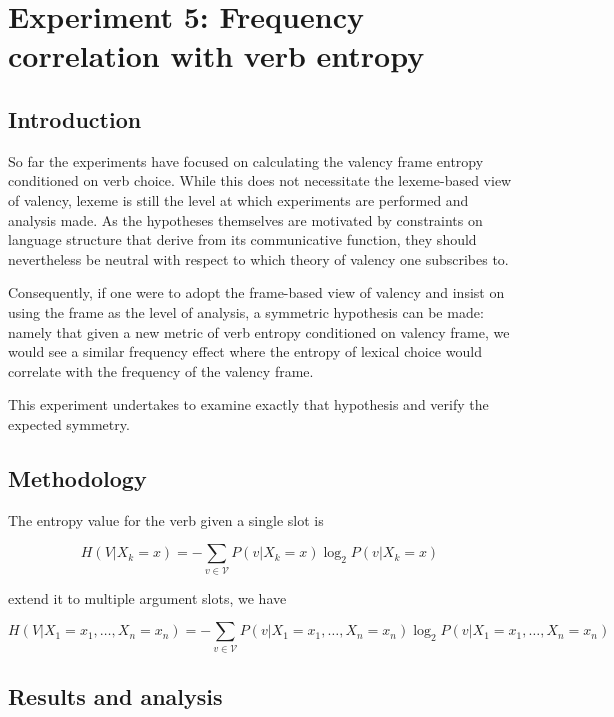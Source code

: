 \section{Experiment 5: Frequency correlation with verb entropy}\label{sec:exp5-verb-entropy}

\subsection{Introduction}

So far the experiments have focused on calculating the valency frame entropy conditioned on verb choice. While this does not necessitate the lexeme-based view of valency, lexeme is still the level at which experiments are performed and analysis made. As the hypotheses themselves are motivated by constraints on language structure that derive from its communicative function, they should nevertheless be neutral with respect to which theory of valency one subscribes to. 

Consequently, if one were to adopt the frame-based view of valency and insist on using the frame as the level of analysis, a symmetric hypothesis can be made: namely that given a new metric of verb entropy conditioned on valency frame, we would see a similar frequency effect where the entropy of lexical choice would correlate with the frequency of the valency frame. 

This experiment undertakes to examine exactly that hypothesis and verify the expected symmetry.

\subsection{Methodology}

The entropy value for the verb given a single slot is

$$
H(V|X_{k}=x)=
-\sum\limits_{v\in{}\mathcal{V}}{P(v|X_k=x)\log_{2}{P(v|X_k=x)}}
$$

extend it to multiple argument slots, we have

$$
H(V|X_1=x_1,\ldots,X_n=x_n)=
-\sum\limits_{v\in{}\mathcal{V}}{P(v|X_1=x_1,\ldots,X_n=x_n)\log_2P(v|X_1=x_1,\ldots,X_n=x_n)}
$$

\subsection{Results and analysis}

